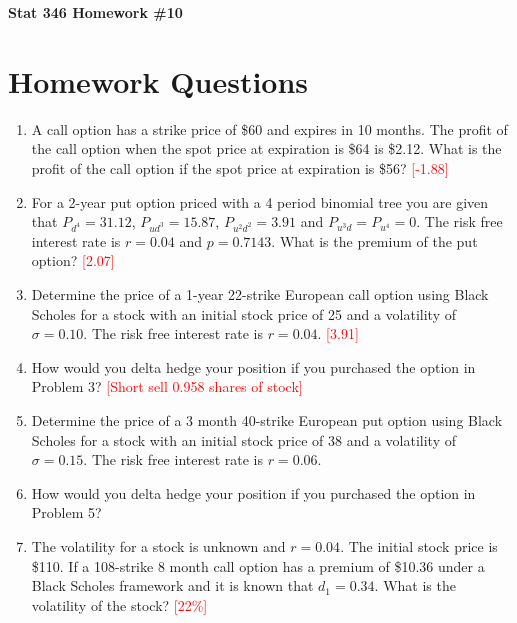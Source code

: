 \documentclass{article}
\begin{document}
\begin{center}
\textbf{Stat 346 Homework \#10}\\
\vspace{0.3in}
\end{center}

\section*{Homework Questions}

\begin{enumerate}

\item A call option has a strike price of \$60 and expires in 10 months. The profit of the call option when the spot price at expiration is \$64 is \$2.12. What is the profit of the call option if the spot price at expiration is \$56?  \textcolor{red}{[-1.88]}

\item For a 2-year put option priced with a 4 period binomial tree you are given that $P_{d^4} = 31.12$, $P_{ud^3} = 15.87$, $P_{u^2d^2} = 3.91$ and $P_{u^3d} = P_{u^4} = 0$. The risk free interest rate is $r = 0.04$ and $p = 0.7143$. What is the premium of the put option? \textcolor{red}{[2.07]}

\item Determine the price of a 1-year 22-strike European call option using Black Scholes for a stock with an initial stock price of 25 and a volatility of $\sigma = 0.10$. The risk free interest rate is $r = 0.04$. \textcolor{red}{[3.91]}

\item How would you delta hedge your position if you purchased the option in Problem 3? \textcolor{red}{[Short sell 0.958 shares of stock]}

\item Determine the price of a 3 month 40-strike European put option using Black Scholes for a stock with an initial stock price of 38 and a volatility of $\sigma = 0.15$. The risk free interest rate is $r = 0.06$. 

\item How would you delta hedge your position if you purchased the option in Problem 5?

\item The volatility for a stock is unknown and $r = 0.04$. The initial stock price is \$110. If a 108-strike 8 month call option has a premium of \$10.36 under a Black Scholes framework and it is known that $d_1 = 0.34$. What is the volatility of the stock? \textcolor{red}{[22\%]}


\end{enumerate}
\end{document}
